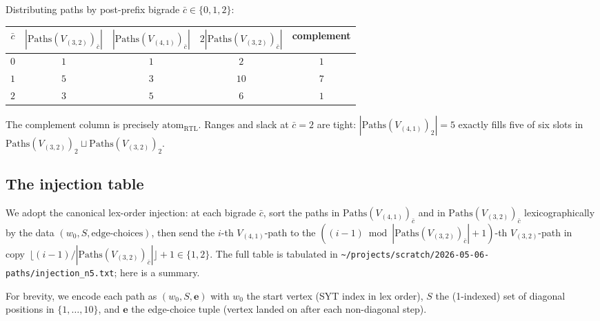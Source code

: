 \documentclass[11pt]{article}
\theoremstyle{definition}
\begin{document}
Distributing paths by post-prefix bigrade $\bar c \in \{0,1,2\}$:
\begin{center}
\begin{tabular}{c|ccc|c}
$\bar c$ & $|\mathrm{Paths}(V_{(3,2)})_{\bar c}|$ & $|\mathrm{Paths}(V_{(4,1)})_{\bar c}|$ & $2|\mathrm{Paths}(V_{(3,2)})_{\bar c}|$ & complement\\\hline
$0$ & $1$ & $1$ & $2$ & $1$\\
$1$ & $5$ & $3$ & $10$ & $7$\\
$2$ & $3$ & $5$ & $6$ & $1$\\
\end{tabular}
\end{center}

The complement column is precisely $\mathrm{atom}_{\mathrm{RTL}}$. Ranges and slack at $\bar c = 2$ are tight: $|\mathrm{Paths}(V_{(4,1)})_2| = 5$ exactly fills five of six slots in $\mathrm{Paths}(V_{(3,2)})_2 \sqcup \mathrm{Paths}(V_{(3,2)})_2$.

\subsection*{The injection table}

We adopt the canonical lex-order injection: at each bigrade $\bar c$, sort the paths in $\mathrm{Paths}(V_{(4,1)})_{\bar c}$ and in $\mathrm{Paths}(V_{(3,2)})_{\bar c}$ lexicographically by the data $(w_0, S, \text{edge-choices})$, then send the $i$-th $V_{(4,1)}$-path to the $((i-1) \bmod |\mathrm{Paths}(V_{(3,2)})_{\bar c}| + 1)$-th $V_{(3,2)}$-path in copy~$\lfloor (i-1)/|\mathrm{Paths}(V_{(3,2)})_{\bar c}|\rfloor + 1 \in \{1,2\}$. The full table is tabulated in \texttt{\textasciitilde/projects/scratch/2026-05-06-paths/injection\_n5.txt}; here is a summary.

For brevity, we encode each path as $(w_0, S, \mathbf{e})$ with $w_0$ the start vertex (SYT index in lex order), $S$ the (1-indexed) set of diagonal positions in $\{1,\dots,10\}$, and $\mathbf{e}$ the edge-choice tuple (vertex landed on after each non-diagonal step).
\end{document}

